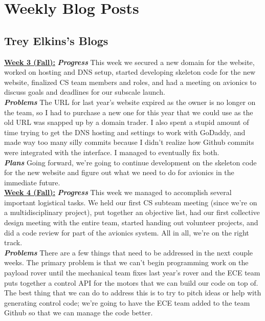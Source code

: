 \documentclass[onecolumn, draftclsnofoot, 10pt, compsoc]{IEEEtran}
\begin{document}
\section{Weekly Blog Posts}

\subsection{Trey Elkins's Blogs}
\underline{\textbf{Week 3 (Fall):}}
\newline\textbf{\textit{{Progress}}}
\newline This week we secured a new domain for the website, worked on hosting and DNS setup, started developing skeleton code for the new website, finalized CS team members and roles, and had a meeting on avionics to discuss goals and deadlines for our subscale launch. \\

\textbf{\textit{{Problems}}}
\newline The URL for last year's website expired as the owner is no longer on the team, so I had to purchase a new one for this year that we could use as the old URL was snapped up by a domain trader. I also spent a stupid amount of time trying to get the DNS hosting and settings to work with GoDaddy, and made way too many silly commits because I didn't realize how Github commits were integrated with the interface. I managed to eventually fix both. \\

\textbf{\textit{{Plans}}}
\newline Going forward, we're going to continue development on the skeleton code for the new website and figure out what we need to do for avionics in the immediate future. \\

\underline{\textbf{Week 4 (Fall):}}
\newline\textbf{\textit{{Progress}}}
\newline This week we managed to accomplish several important logistical tasks. We held our first CS subteam meeting
(since we're on a multidisciplinary project), put together an objective list, had our first collective design 
meeting with the entire team, started handing out volunteer projects, and did a code review for part of the
avionics system. All in all, we're on the right track.\\

\textbf{\textit{{Problems}}}
\newline There are a few things that need to be addressed in the next couple weeks. The primary problem is that we can't
begin programming work on the payload rover until the mechanical team fixes last year's rover and the ECE team
puts together a control API for the motors that we can build our code on top of. The best thing that we can do
to address this is to try to pitch ideas or help with generating control code; we're going to have the ECE team
added to the team Github so that we can manage the code better. \\
\end{document}
